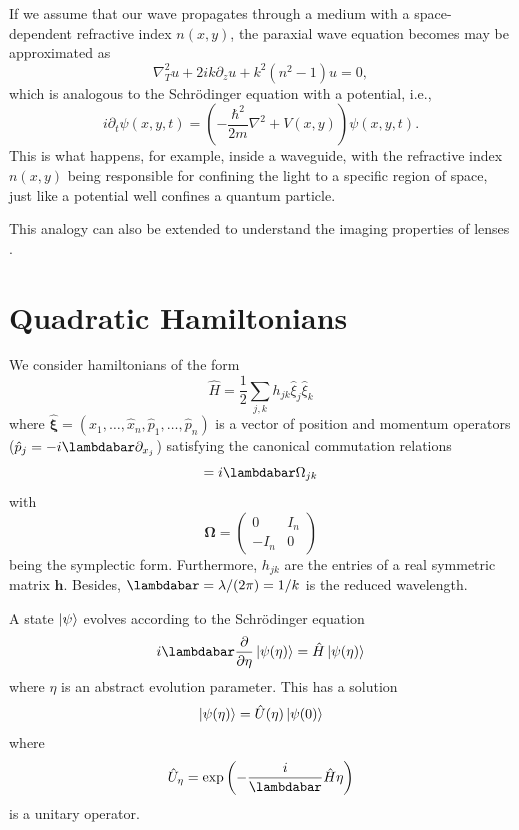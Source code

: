 \documentclass[a4paper,10pt]{report}
\begin{document}
If we assume that our wave propagates through a medium with a space-dependent refractive index $n(x,y)$, the paraxial wave equation becomes may be approximated as
\begin{equation}
    \nabla^2_T u + 2ik \partial_z u + k^2(n^2 - 1) u = 0,
\end{equation}
which is analogous to the Schrödinger equation with a potential, i.e.,
\begin{equation}
    i \partial_t \psi(x, y, t) = \left( -\frac{\hbar^2}{2m} \nabla^2 + V(x,y) \right) \psi(x, y, t).
\end{equation}
This is what happens, for example, inside a waveguide, with the refractive index $n(x,y)$ being responsible for confining the light to a specific region of space, just like a potential well confines a quantum particle.

This analogy can also be extended to understand the imaging properties of lenses \cite{Stoler:81}.

\section{Quadratic Hamiltonians}

We consider hamiltonians of the form
\begin{equation}
\hat{H} = \frac{1}{2} \sum_{j,k} h_{jk} \hat{\xi}_j \hat{\xi}_k
\end{equation}
where $\boldsymbol{\hat{\xi}} = (\hat{x}_1, \ldots, \hat{x}_n, \hat{p}_1, \ldots, \hat{p}_n)$ is a vector of position and momentum operators ($\hat{p}_j = -i \lambdabar \partial_{x_j}$) satisfying the canonical commutation relations
\begin{equation}
[\hat{\xi}_j, \hat{\xi}_k] = i \lambdabar \Omega_{jk}
\end{equation}
with
\begin{equation}
\boldsymbol{\Omega} = \begin{pmatrix}0 & I_n \\ -I_n & 0 \end{pmatrix}
\end{equation}
being the symplectic form. Furthermore, $h_{jk}$ are the entries of a real symmetric matrix $\mathbf{h}$. Besides, $\lambdabar = \lambda/(2\pi) = 1/k$ is the reduced wavelength.

A state $\ket{\psi}$ evolves according to the Schrödinger equation
\begin{equation}
    \label{eq:schrodinger_like_equation}
i \lambdabar \frac{\partial}{\partial \eta} \ket{\psi(\eta)} = \hat{H} \ket{\psi(\eta)}
\end{equation}
where $\eta$ is an abstract evolution parameter. This has a solution
\begin{equation}
    \label{eq:schrodinger_like_solution}
    \ket{\psi(\eta)} = \hat{U}(\eta) \ket{\psi(0)}
\end{equation}
where
\begin{equation}\hat{U}_\eta = \exp\left(-\frac{i}{\lambdabar} \hat{H} \eta\right)\end{equation}
is a unitary operator.
\end{document}
